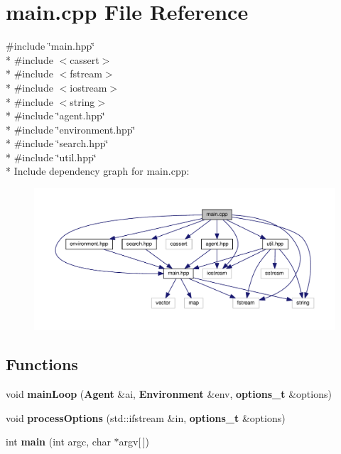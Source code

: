 \section{main.\+cpp File Reference}
\label{main_8cpp}
{\ttfamily \#include \char`\"{}main.\+hpp\char`\"{}}\\*
{\ttfamily \#include $<$cassert$>$}\\*
{\ttfamily \#include $<$fstream$>$}\\*
{\ttfamily \#include $<$iostream$>$}\\*
{\ttfamily \#include $<$string$>$}\\*
{\ttfamily \#include \char`\"{}agent.\+hpp\char`\"{}}\\*
{\ttfamily \#include \char`\"{}environment.\+hpp\char`\"{}}\\*
{\ttfamily \#include \char`\"{}search.\+hpp\char`\"{}}\\*
{\ttfamily \#include \char`\"{}util.\+hpp\char`\"{}}\\*
Include dependency graph for main.\+cpp\+:
\nopagebreak
\begin{figure}[H]
\begin{center}
\leavevmode
\includegraphics[width=350pt]{main_8cpp__incl}
\end{center}
\end{figure}
\subsection*{Functions}
\begin{DoxyCompactItemize}
\item 
void {\bf main\+Loop} ({\bf Agent} \&ai, {\bf Environment} \&env, {\bf options\+\_\+t} \&options)
\item 
void {\bf process\+Options} (std\+::ifstream \&in, {\bf options\+\_\+t} \&options)
\item 
int {\bf main} (int argc, char $\ast$argv[$\,$])
\end{DoxyCompactItemize}
